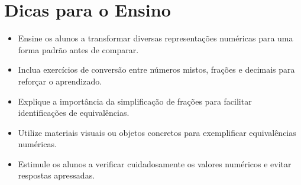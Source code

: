 \documentclass{article}
\begin{document}
\section{Dicas para o Ensino}
\begin{itemize}
  \item Ensine os alunos a transformar diversas representações numéricas para uma forma padrão antes de comparar.
  \item Inclua exercícios de conversão entre números mistos, frações e decimais para reforçar o aprendizado.
  \item Explique a importância da simplificação de frações para facilitar identificações de equivalências.
  \item Utilize materiais visuais ou objetos concretos para exemplificar equivalências numéricas.
  \item Estimule os alunos a verificar cuidadosamente os valores numéricos e evitar respostas apressadas.
\end{itemize}
\end{document}
